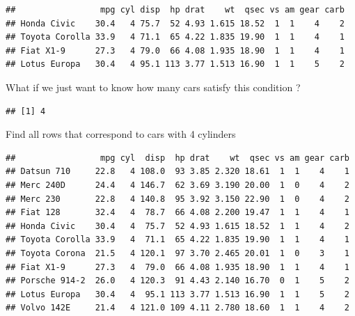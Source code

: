 \documentclass[]{book}
\newenvironment{Shaded}{\begin{snugshade}}{\end{snugshade}}
\newcommand{\KeywordTok}[1]{\textcolor[rgb]{0.13,0.29,0.53}{\textbf{#1}}}
\newcommand{\DecValTok}[1]{\textcolor[rgb]{0.00,0.00,0.81}{#1}}
\newcommand{\FloatTok}[1]{\textcolor[rgb]{0.00,0.00,0.81}{#1}}
\newcommand{\StringTok}[1]{\textcolor[rgb]{0.31,0.60,0.02}{#1}}
\newcommand{\OperatorTok}[1]{\textcolor[rgb]{0.81,0.36,0.00}{\textbf{#1}}}
\newcommand{\NormalTok}[1]{#1}
\begin{document}
\begin{Shaded}
\end{Shaded}

\begin{verbatim}
##                 mpg cyl disp  hp drat    wt  qsec vs am gear carb
## Honda Civic    30.4   4 75.7  52 4.93 1.615 18.52  1  1    4    2
## Toyota Corolla 33.9   4 71.1  65 4.22 1.835 19.90  1  1    4    1
## Fiat X1-9      27.3   4 79.0  66 4.08 1.935 18.90  1  1    4    1
## Lotus Europa   30.4   4 95.1 113 3.77 1.513 16.90  1  1    5    2
\end{verbatim}

What if we just want to know how many cars satisfy this condition ?

\begin{Shaded}
\end{Shaded}

\begin{verbatim}
## [1] 4
\end{verbatim}

Find all rows that correspond to cars with 4 cylinders

\begin{Shaded}
\end{Shaded}

\begin{verbatim}
##                 mpg cyl  disp  hp drat    wt  qsec vs am gear carb
## Datsun 710     22.8   4 108.0  93 3.85 2.320 18.61  1  1    4    1
## Merc 240D      24.4   4 146.7  62 3.69 3.190 20.00  1  0    4    2
## Merc 230       22.8   4 140.8  95 3.92 3.150 22.90  1  0    4    2
## Fiat 128       32.4   4  78.7  66 4.08 2.200 19.47  1  1    4    1
## Honda Civic    30.4   4  75.7  52 4.93 1.615 18.52  1  1    4    2
## Toyota Corolla 33.9   4  71.1  65 4.22 1.835 19.90  1  1    4    1
## Toyota Corona  21.5   4 120.1  97 3.70 2.465 20.01  1  0    3    1
## Fiat X1-9      27.3   4  79.0  66 4.08 1.935 18.90  1  1    4    1
## Porsche 914-2  26.0   4 120.3  91 4.43 2.140 16.70  0  1    5    2
## Lotus Europa   30.4   4  95.1 113 3.77 1.513 16.90  1  1    5    2
## Volvo 142E     21.4   4 121.0 109 4.11 2.780 18.60  1  1    4    2
\end{verbatim}
\end{document}
